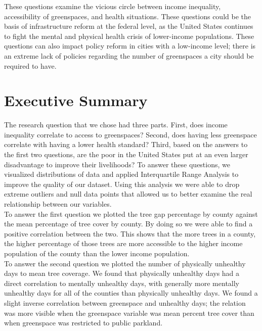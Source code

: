 \documentclass{article}
\begin{document}
These questions examine the vicious circle between income inequality, accessibility of greenspaces, and health situations. These questions could be the basis of infrastructure reform at the federal level, as the United States continues to fight the mental and physical health crisis of lower-income populations. These questions can also impact policy reform in cities with a low-income level; there is an extreme lack of policies regarding the number of greenspaces a city should be required to have.




\section{Executive Summary}

The research question that we chose had three parts. First, does income inequality correlate to access to greenspaces? Second, does having less greenspace correlate with having a lower health standard? Third, based on the answers to the first two questions, are the poor in the United States put at an even larger disadvantage to improve their livelihoods? To answer these questions, we visualized distributions of data and applied Interquartile Range Analysis to improve the quality of our dataset. Using this analysis we were able to drop extreme outliers and null data points that allowed us to better examine the real relationship between our variables.\\

To answer the first question we plotted the tree gap percentage by county against the mean percentage of tree cover by county. By doing so we were able to find a positive correlation between the two. This shows that the more trees in a county, the higher percentage of those trees are more accessible to the higher income population of the county than the lower income population.\\

To answer the second question we plotted the number of physically unhealthy days to mean tree coverage. We found that physically unhealthy days had a direct correlation to mentally unhealthy days, with generally more mentally unhealthy days for all of the counties than physically unhealthy days. We found a slight inverse correlation between greenspace and unhealthy days; the relation was more visible when the greenspace variable was mean percent tree cover than when greenspace was restricted to public parkland.\\
\end{document}

